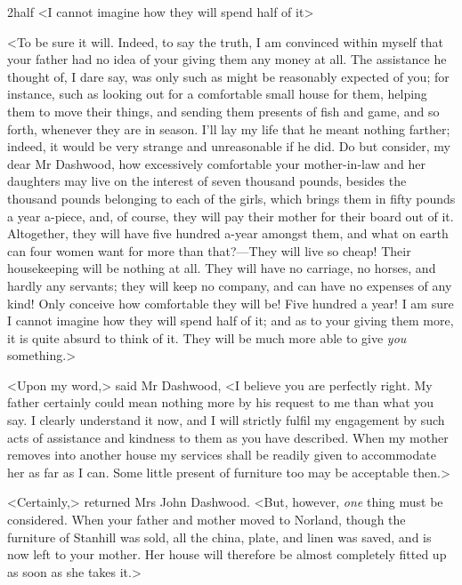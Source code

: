 
\begin{bwbigpic}
	[1.0]
	{2half} 
	{<I cannot imagine how they will spend half of it>} 
\end{bwbigpic}

<To be sure it will. Indeed, to say the truth, I am convinced within myself that your father had no idea of your giving them any money at all. The assistance he thought of, I dare say, was only such as might be reasonably expected of you; for instance, such as looking out for a comfortable small house for them, helping them to move their things, and sending them presents of fish and game, and so forth, whenever they are in season. I'll lay my life that he meant nothing farther; indeed, it would be very strange and unreasonable if he did. Do but consider, my dear Mr Dashwood, how excessively comfortable your mother-in-law and her daughters may live on the interest of seven thousand pounds, besides the thousand pounds belonging to each of the girls, which brings them in fifty pounds a year a-piece, and, of course, they will pay their mother for their board out of it. Altogether, they will have five hundred a-year amongst them, and what on earth can four women want for more than that?—They will live so cheap! Their housekeeping will be nothing at all. They will have no carriage, no horses, and hardly any servants; they will keep no company, and can have no expenses of any kind! Only conceive how comfortable they will be! Five hundred a year! I am sure I cannot imagine how they will spend half of it; and as to your giving them more, it is quite absurd to think of it. They will be much more able to give \textit{you} something.>



<Upon my word,> said Mr Dashwood, <I believe you are perfectly right. My father certainly could mean nothing more by his request to me than what you say. I clearly understand it now, and I will strictly fulfil my engagement by such acts of assistance and kindness to them as you have described. When my mother removes into another house my services shall be readily given to accommodate her as far as I can. Some little present of furniture too may be acceptable then.>

<Certainly,> returned Mrs John Dashwood. <But, however, \textit{one} thing must be considered. When your father and mother moved to Norland, though the furniture of Stanhill was sold, all the china, plate, and linen was saved, and is now left to your mother. Her house will therefore be almost completely fitted up as soon as she takes it.>

